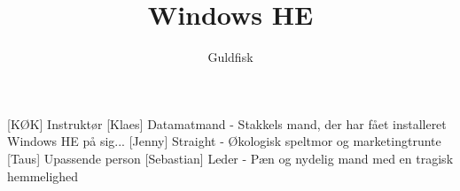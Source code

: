 \documentclass[a4paper,11pt]{article}
\title{Windows HE}
\author{Guldfisk}
\begin{document}
\maketitle

\begin{roles}
    [KØK] Instruktør
    [Klaes] Datamatmand - Stakkels mand, der har fået installeret Windows HE på sig...
    [Jenny] Straight -  Økologisk speltmor og marketingtrunte
    [Taus] Upassende person
    [Sebastian] Leder - Pæn og nydelig mand med en tragisk hemmelighed
\end{roles}

\begin{props}
\end{props}
\end{document}

